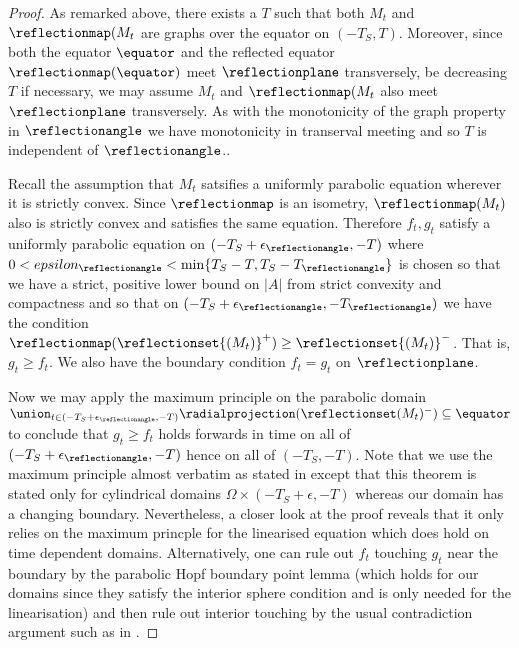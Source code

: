 \documentclass[12pt]{amsart}
\begin{document}
\begin{proof}
As remarked above, there exists a \(T\) such that both \(M_t\) and \(\reflectionmap(M_t\) are graphs over the equator on \((-T_S, T)\). Moreover, since both the equator \(\equator\) and the reflected equator \(\reflectionmap(\equator)\) meet \(\reflectionplane\) transversely, be decreasing \(T\) if necessary, we may assume \(M_t\) and \(\reflectionmap(M_t\) also meet \(\reflectionplane\) transversely. As with the monotonicity of the graph property in \(\reflectionangle\) we have monotonicity in transerval meeting and so \(T\) is independent of \(\reflectionangle\)..

Recall the assumption that \(M_t\) satsifies a uniformly parabolic equation wherever it is strictly convex. Since \(\reflectionmap\) is an isometry, \(\reflectionmap(M_t)\) also is strictly convex and satisfies the same equation. Therefore \(f_t,g_t\) satisfy a uniformly parabolic equation on \((-T_S + \epsilon_{\reflectionangle}, -T)\) where \(0 < epsilon_{\reflectionangle} < \min\{T_S-T, T_S-T_{\reflectionangle}\}\) is chosen so that we have a strict, positive lower bound on \(|A|\) from strict convexity and compactness and so that on \((-T_S + \epsilon_{\reflectionangle}, -T_{\reflectionangle})\) we have the condition \(\reflectionmap(\reflectionset{(M_t)}^+) \geq \reflectionset{(M_t)}^-\). That is, \(g_t \geq f_t\). We also have the boundary condition \(f_t = g_t\) on \(\reflectionplane\).

Now we may apply the maximum principle on the parabolic domain \(\union_{t \in (-T_S + \epsilon_{\reflectionangle}, -T)} \radialprojection(\reflectionset(M_t)^-) \subseteq \equator\) to conclude that \(g_t \geq f_t\) holds forwards in time on all of \((-T_S + \epsilon_{\reflectionangle}, -T)\) hence on all of \((-T_S, -T)\). Note that we use the maximum principle almost verbatim as stated in \cite[3.7, Theorem 12]{MR762825} except that this theorem is stated only for cylindrical domains \(\Omega \times (-T_S + \epsilon, -T)\) whereas our domain has a changing boundary. Nevertheless, a closer look at the proof reveals that it only relies on the maximum princple for the linearised equation \cite[3.3, Theorem 7, remark (ii)]{MR762825} which does hold on time dependent domains. Alternatively, one can rule out \(f_t\) touching \(g_t\) near the boundary by the parabolic Hopf boundary point lemma \cite[3.3, Theorem 6]{MR762825} (which holds for our domains since they satisfy the interior sphere condition and is only needed for the linearisation) and then rule out interior touching by the usual contradiction argument such as in \cite[3.2 Lemma]{MR837523}.
\end{proof}
\end{document}
